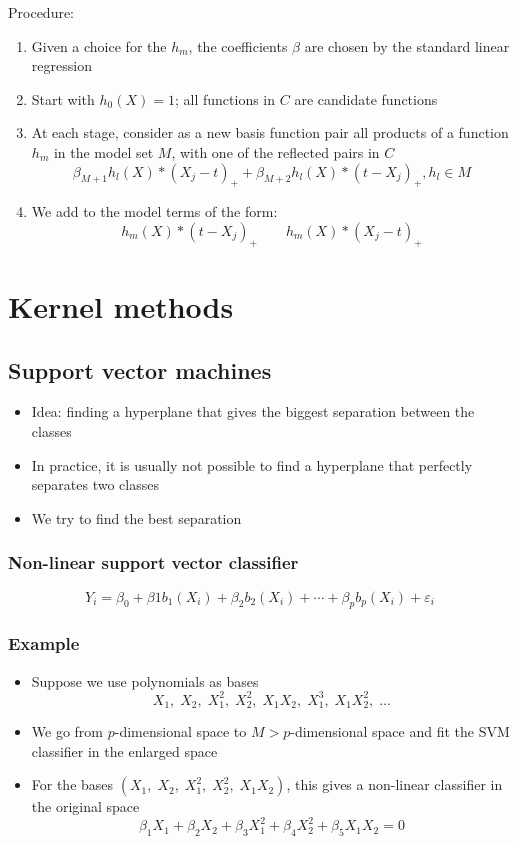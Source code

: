\documentclass{article}
\begin{document}
        Procedure:
        \begin{enumerate}
            \item Given a choice for the $h_m$, the coefficients $\beta$ are chosen by the standard linear regression
            \item Start with $h_0(X) = 1$; all functions in $C$ are candidate functions
            \item At each stage, consider as a new basis function pair all products of a function $h_m$ in the model set $M$, with one of the reflected pairs in $C$
            \[ \beta_{M+1} h_l(X) * {(X_j - t)}_+ + \beta_{M+2} h_l(X) * {(t - X_j)}_+, h_l \in M \]
            \item We add to the model terms of the form: 
            \[ h_m(X) * {(t - X_j)}_+ \qquad h_m(X) * {(X_j - t)}_+ \]
        \end{enumerate}

    \newpage

\section{Kernel methods}
    \subsection{Support vector machines}
    \begin{itemize}
        \item Idea: finding a hyperplane that gives the biggest separation between the classes
        \item In practice, it is usually not possible to find a hyperplane that perfectly separates two classes
        \item We try to find the best separation
    \end{itemize}

        \subsubsection{Non-linear support vector classifier}
        \[ Y_i = \beta_0 + \beta1 b_1 (X_i) + \beta_2 b_2 (X_i) + \cdots + \beta_p b_p (X_i) + \varepsilon_i \]

        \subsubsection{Example}
        \begin{itemize}
            \item Suppose we use polynomials as bases
            \[ X_1,\; X_2,\; X_1^2,\; X_2^2,\; X_1 X_2,\; X_1^3,\; X_1 X_2^2,\; \ldots \]
            \item We go from $p$-dimensional space to $M > p$-dimensional space and fit the SVM classifier in the enlarged space
            \item For the bases $(X_1,\; X_2,\; X_1^2,\; X_2^2,\; X_1 X_2)$, this gives a non-linear classifier in the original space
            \[ \beta_1 X_1 + \beta_2 X_2 + \beta_3 X_1^2 + \beta_4 X_2^2 + \beta_5 X_1 X_2 = 0 \]
        \end{itemize}
\end{document}
